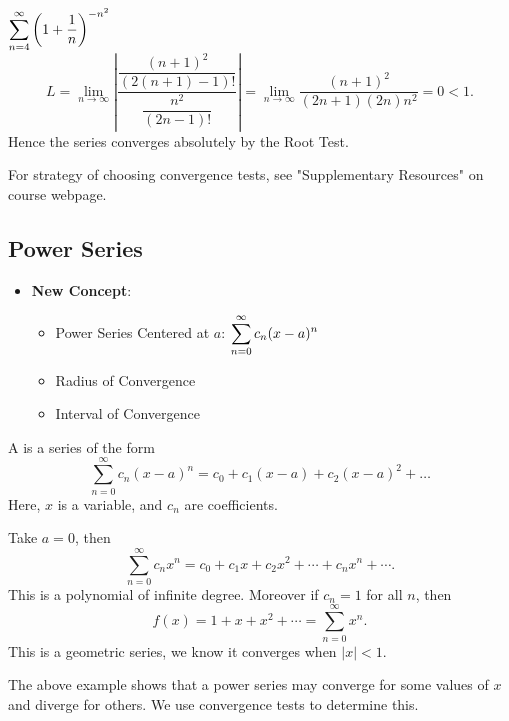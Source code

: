 \begin{ex}
    $\displaystyle\sum_{n=4}^\infty \left(1+\dfrac{1}{n} \right)^{-n^2}$ 
    \[ L = \lim_{n\to \infty} \left| \dfrac{\dfrac{(n+1)^2}{(2(n+1)-1)!}}{\dfrac{n^2}{(2n-1)!}}\right| = \lim_{n\to \infty} \dfrac{(n+1)^2}{(2n+1)(2n) n^2} = 0 < 1.\]
    Hence the series converges absolutely by the Root Test. 
\end{ex}
For strategy of choosing convergence tests, see "Supplementary Resources" on course webpage.


\subsection{Power Series}  
\begin{center}
\begin{tcolorbox}
    \begin{itemize}
        \item \textbf{New Concept}: 
        \begin{itemize}
            \item Power Series Centered at $a$: $\displaystyle\sum_{n=0}^\infty c_n (x-a)^n$
            \item Radius of Convergence 
            \item Interval of Convergence
        \end{itemize}
    \end{itemize}
\end{tcolorbox}
\end{center}
\begin{defn}
    A  is a series of the form
    \[\sum_{n=0}^\infty c_n (x-a)^n = c_0 + c_1 (x-a) + c_2 (x-a)^2 + \dots\]
    Here, $x$ is a variable, and $c_n$ are coefficients.
\end{defn}

\begin{ex}
    Take $a=0$, then 
    \[\sum_{n=0}^\infty c_n x^n = c_0 + c_1 x + c_2 x^2 + \cdots + c_n x^n + \cdots.\]
    This is a polynomial of infinite degree.
    Moreover if $c_n = 1$ for all $n$, then 
    \[f(x) = 1 + x + x^2 + \cdots = \sum_{n=0}^\infty x^n.\]
    This is a geometric series, we know it converges when $|x|<1$.
\end{ex}

The above example shows that a power series may converge for some values of $x$ and diverge for others. We use convergence tests to determine this.


